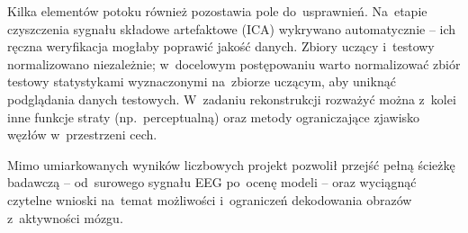 \documentclass[12pt,a4paper,numbers=enddot,headings=small]{scrartcl} %
\begin{document}
	Kilka elementów potoku również pozostawia pole do~usprawnień. Na~etapie
	czyszczenia sygnału składowe artefaktowe (ICA) wykrywano automatycznie -- ich
	ręczna weryfikacja mogłaby poprawić jakość danych. Zbiory uczący i~testowy
	normalizowano niezależnie; w~docelowym postępowaniu warto normalizować zbiór
	testowy statystykami wyznaczonymi na~zbiorze uczącym, aby uniknąć podglądania
	danych testowych. W~zadaniu rekonstrukcji rozważyć można z~kolei inne funkcje
	straty (np.~perceptualną) oraz metody ograniczające zjawisko węzłów
	w~przestrzeni cech.
	
	Mimo umiarkowanych wyników liczbowych projekt pozwolił przejść pełną ścieżkę
	badawczą -- od~surowego sygnału EEG po~ocenę modeli -- oraz wyciągnąć czytelne
	wnioski na~temat możliwości i~ograniczeń dekodowania obrazów z~aktywności
	mózgu.
	
	
\end{document}

